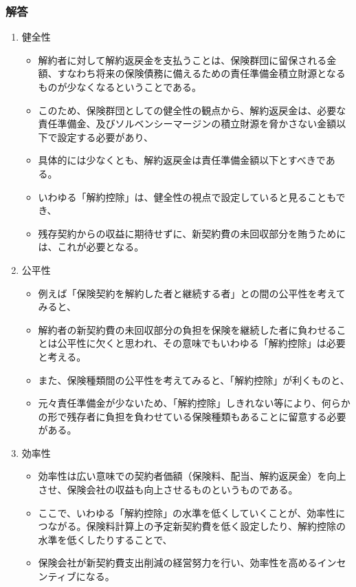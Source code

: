 \documentclass[report,gutter=10mm,fore-edge=10mm]{jlreq}
\begin{document}
\subsubsection{解答}
  \begin{enumerate}
    \item 健全性
    \begin{itemize}
      \item 解約者に対して解約返戻金を支払うことは、保険群団に留保される金額、すなわち将来の保険債務に備えるための責任準備金積立財源となるものが少なくなるということである。
      \item このため、保険群団としての健全性の観点から、解約返戻金は、必要な責任準備金、及びソルベンシーマージンの積立財源を脅かさない金額以下で設定する必要があり、
      \item 具体的には少なくとも、解約返戻金は責任準備金額以下とすべきである。
      \item いわゆる「解約控除」は、健全性の視点で設定していると見ることもでき、
      \item 残存契約からの収益に期待せずに、新契約費の未回収部分を賄うためには、これが必要となる。
    \end{itemize}
    \item 公平性
    \begin{itemize}
      \item 例えば「保険契約を解約した者と継続する者」との間の公平性を考えてみると、
      \item 解約者の新契約費の未回収部分の負担を保険を継続した者に負わせることは公平性に欠くと思われ、その意味でもいわゆる「解約控除」は必要と考える。
      \item また、保険種類間の公平性を考えてみると、「解約控除」が利くものと、
      \item 元々責任準備金が少ないため、「解約控除」しきれない等により、何らかの形で残存者に負担を負わせている保険種類もあることに留意する必要がある。
    \end{itemize}
    \item 効率性
    \begin{itemize}
      \item 効率性は広い意味での契約者価額（保険料、配当、解約返戻金）を向上させ、保険会社の収益も向上させるものというものである。
      \item ここで、いわゆる「解約控除」の水準を低くしていくことが、効率性につながる。保険料計算上の予定新契約費を低く設定したり、解約控除の水準を低くしたりすることで、
      \item 保険会社が新契約費支出削減の経営努力を行い、効率性を高めるインセンティブになる。

\end{itemize}
\end{enumerate}
\end{document}
